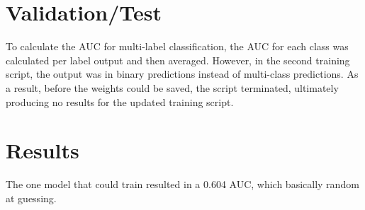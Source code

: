 \documentclass[10pt,twocolumn,letterpaper]{article}
\begin{document}
\section{Validation/Test}
To calculate the AUC for multi-label classification, the AUC for each class was calculated per label output and then averaged. However, in the second training script, the output was in binary predictions instead of multi-class predictions. As a result, before the weights could be saved, the script terminated, ultimately producing no results for the updated training script.

\section{Results}
The one model that could train resulted in a 0.604 AUC, which basically random at guessing.





{\small



}
\end{document}
